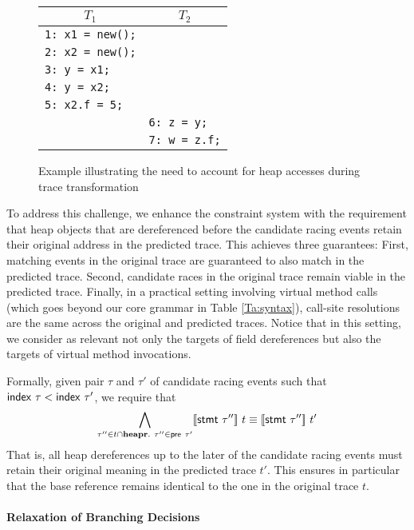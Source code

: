 \begin{figure}
	\centering
	\begin{tabular}{ll}
		\hline
		\multicolumn{1}{c}{$T_1$} & \multicolumn{1}{c}{$T_2$} \\
		\hline
		{\tt 1: x1 = new();} & \\
		{\tt 2: x2 = new();} & \\
		{\tt 3: y = x1;} & \\
		{\tt 4: y = x2;} & \\
		{\tt 5: x2.f = 5;} & \\	
		& {\tt 6: z = y;} \\
		& {\tt 7: w = z.f;} \\
	\end{tabular}
	\caption{\label{fig:heapAccess}Example illustrating the need to account for heap accesses during trace transformation}
\end{figure}

To address this challenge, we enhance the constraint system with the requirement that heap objects that are dereferenced before the candidate racing events retain their original address in the predicted trace.
This achieves three guarantees: First, matching events in the original trace are guaranteed to also match in the predicted trace. Second, candidate races in the original trace remain viable in the predicted trace. Finally, in a practical setting involving virtual method calls (which goes beyond our core grammar in Table \ref{Ta:syntax}), call-site resolutions are the same across the original and predicted traces. Notice that in this setting, we consider as relevant not only the targets of field dereferences but also the targets of virtual method invocations.

Formally, given pair $\tau$ and $\tau'$ of candidate racing events such that ${\sf index}\ \tau < {\sf index}\ \tau'$, 
we require that
$$
\bigwedge_{\tau'' \in t \cap {\bf heapr}.\
	\tau'' \in {\sf pre}\ \tau'} \lbrack\!\lbrack {\sf stmt}\ \tau'' \rbrack\!\rbrack\ t \equiv \lbrack\!\lbrack {\sf stmt}\ \tau'' \rbrack\!\rbrack\ t'
$$ 
That is, all heap dereferences up to the later of the candidate racing events must retain their original meaning in the predicted trace $t'$. This ensures in particular that the base reference remains identical to the one in the original trace $t$. 

\paragraph{Relaxation of Branching Decisions}

